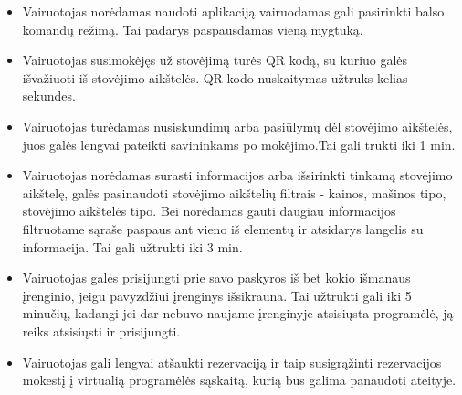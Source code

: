 \documentclass{VUMIFPSkursinis}
\begin{document}
\begin{itemize}
	\item Vairuotojas norėdamas naudoti aplikaciją vairuodamas gali pasirinkti balso komandų režimą. Tai padarys paspausdamas vieną mygtuką.
	\item Vairuotojas susimokėjęs už stovėjimą turės QR kodą, su kuriuo galės išvažiuoti iš stovėjimo aikštelės. QR kodo nuskaitymas užtruks kelias sekundes.
	\item Vairuotojas turėdamas nusiskundimų arba pasiūlymų dėl stovėjimo aikštelės, juos galės lengvai pateikti savininkams po mokėjimo.Tai gali trukti iki 1 min.
	\item Vairuotojas norėdamas surasti informacijos arba išsirinkti tinkamą stovėjimo aikštelę, galės pasinaudoti stovėjimo aikštelių filtrais - kainos, mašinos tipo, stovėjimo aikštelės tipo. Bei norėdamas gauti daugiau informacijos filtruotame sąraše paspaus ant vieno iš elementų ir atsidarys langelis su informacija. Tai gali užtrukti iki 3 min.
	\item Vairuotojas galės prisijungti prie savo paskyros iš bet kokio išmanaus įrenginio, jeigu pavyzdžiui įrenginys išsikrauna. Tai užtrukti gali iki 5 minučių, kadangi jei dar nebuvo naujame įrenginyje atsisiųsta programėlė, ją reiks atsisiųsti ir prisijungti.
	\item Vairuotojas gali lengvai atšaukti rezervaciją ir taip susigrąžinti rezervacijos mokestį į virtualią programėlės sąskaitą, kurią bus galima panaudoti ateityje.

\end{itemize}
\end{document}

